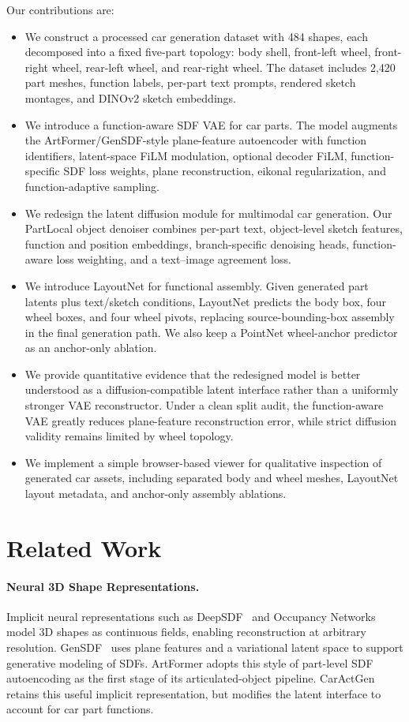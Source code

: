 \documentclass[10pt]{article}
\newcommand{\method}{CarActGen\xspace}
\newcommand{\artformer}{ArtFormer\xspace}
\begin{document}
Our contributions are:
\begin{itemize}
    \item We construct a processed car generation dataset with 484 shapes, each decomposed into a fixed five-part topology: body shell, front-left wheel, front-right wheel, rear-left wheel, and rear-right wheel. The dataset includes 2,420 part meshes, function labels, per-part text prompts, rendered sketch montages, and DINOv2 sketch embeddings.
    \item We introduce a function-aware SDF VAE for car parts. The model augments the \artformer/GenSDF-style plane-feature autoencoder with function identifiers, latent-space FiLM modulation, optional decoder FiLM, function-specific SDF loss weights, plane reconstruction, eikonal regularization, and function-adaptive sampling.
    \item We redesign the latent diffusion module for multimodal car generation. Our PartLocal object denoiser combines per-part text, object-level sketch features, function and position embeddings, branch-specific denoising heads, function-aware loss weighting, and a text--image agreement loss.
    \item We introduce LayoutNet for functional assembly. Given generated part latents plus text/sketch conditions, LayoutNet predicts the body box, four wheel boxes, and four wheel pivots, replacing source-bounding-box assembly in the final generation path. We also keep a PointNet wheel-anchor predictor as an anchor-only ablation.
    \item We provide quantitative evidence that the redesigned model is better understood as a diffusion-compatible latent interface rather than a uniformly stronger VAE reconstructor. Under a clean split audit, the function-aware VAE greatly reduces plane-feature reconstruction error, while strict diffusion validity remains limited by wheel topology.
    \item We implement a simple browser-based viewer for qualitative inspection of generated car assets, including separated body and wheel meshes, LayoutNet layout metadata, and anchor-only assembly ablations.
\end{itemize}

\section{Related Work}

\paragraph{Neural 3D Shape Representations.}
Implicit neural representations such as DeepSDF~\cite{park2019deepsdf} and Occupancy Networks~\cite{mescheder2019occupancy} model 3D shapes as continuous fields, enabling reconstruction at arbitrary resolution. GenSDF~\cite{chou2022gensdf} uses plane features and a variational latent space to support generative modeling of SDFs. \artformer adopts this style of part-level SDF autoencoding as the first stage of its articulated-object pipeline. \method retains this useful implicit representation, but modifies the latent interface to account for car part functions.
\end{document}
